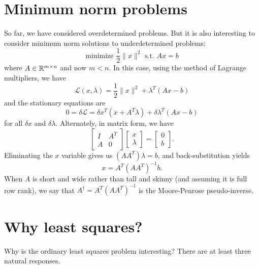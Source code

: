 \documentclass[12pt, leqno]{article} %
\begin{document}
\section{Minimum norm problems}

So far, we have considered overdetermined problems.  But it is also
interesting to consider minimum norm solutions to underdetermined
problems:
\[
  \mbox{minimize } \frac{1}{2} \|x\|^2 \mbox{ s.t. } Ax = b
\]
where $A \in \mathbb{R}^{m \times n}$ and now $m < n$.  In this case, using
the method of Lagrange multipliers, we have
\[
  \mathcal{L}(x, \lambda) = \frac{1}{2} \|x\|^2 + \lambda^T (Ax - b)
\]
and the stationary equations are
\[
0 = \delta \mathcal{L} =
  \delta x^T (x + A^T \lambda) + \delta \lambda^T (Ax-b)
\]
for all $\delta x$ and $\delta \lambda$.  Alternately, in matrix form,
we have
\[
  \begin{bmatrix} I & A^T \\ A & 0 \end{bmatrix}
  \begin{bmatrix} x \\ \lambda \end{bmatrix} =
  \begin{bmatrix} 0 \\ b \end{bmatrix}.
\]
Eliminating the $x$ variable gives us $(AA^T) \lambda = b$,
and back-substitution yields
\[
  x = A^T (A A^T)^{-1} b.
\]
When $A$ is short and wide rather than tall and skinny (and assuming
it is full row rank), we say that $A^\dagger = A^T (AA^T)^{-1}$ is the
Moore-Penrose pseudo-inverse.

\section{Why least squares?}

Why is the ordinary least squares problem interesting?
There are at least three natural responses.
\end{document}
